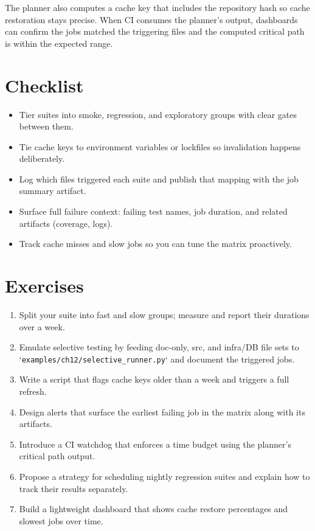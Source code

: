 The planner also computes a cache key that includes the repository hash so cache restoration stays precise. When CI consumes the planner’s output, dashboards can confirm the jobs matched the triggering files and the computed critical path is within the expected range.

\section{Checklist}
\begin{itemize}
  \item Tier suites into smoke, regression, and exploratory groups with clear gates between them.
  \item Tie cache keys to environment variables or lockfiles so invalidation happens deliberately.
  \item Log which files triggered each suite and publish that mapping with the job summary artifact.
  \item Surface full failure context: failing test names, job duration, and related artifacts (coverage, logs).
  \item Track cache misses and slow jobs so you can tune the matrix proactively.
\end{itemize}

\section{Exercises}
\begin{enumerate}
  \item Split your suite into fast and slow groups; measure and report their durations over a week.
  \item Emulate selective testing by feeding doc-only, src, and infra/DB file sets to `\texttt{examples/ch12/selective\_runner.py}` and document the triggered jobs.
  \item Write a script that flags cache keys older than a week and triggers a full refresh.
  \item Design alerts that surface the earliest failing job in the matrix along with its artifacts.
  \item Introduce a CI watchdog that enforces a time budget using the planner's critical path output.
  \item Propose a strategy for scheduling nightly regression suites and explain how to track their results separately.
  \item Build a lightweight dashboard that shows cache restore percentages and slowest jobs over time.
\end{enumerate}

